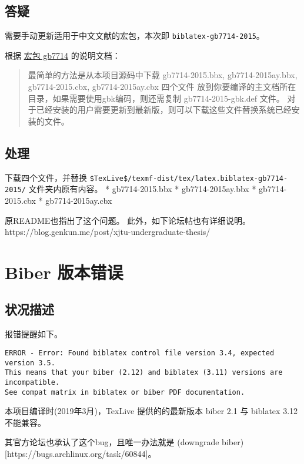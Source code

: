 \documentclass[../Main/thesis.tex]{subfiles}
\begin{document}
\subsection{答疑}

需要手动更新适用于中文文献的宏包，本次即 \texttt{biblatex-gb7714-2015}。

根据 \href{https://github.com/hushidong/biblatex-gb7714-2015}{宏包
gb7714} 的说明文档：

\begin{quote}
最简单的方法是从本项目源码中下载 gb7714-2015.bbx, gb7714-2015ay.bbx,
gb7714-2015.cbx, gb7714-2015ay.cbx 四个文件
放到你要编译的主文档所在目录，如果需要使用gbk编码，则还需复制
gb7714-2015-gbk.def 文件。
对于已经安装的用户需要更新到最新版，则可以下载这些文件替换系统已经安装的文件。
\end{quote}

\subsection{处理}

下载四个文件，并替换
\texttt{\$TexLive\$/texmf-dist/tex/latex.biblatex-gb7714-2015/}
文件夹内原有内容。 * gb7714-2015.bbx * gb7714-2015ay.bbx *
gb7714-2015.cbx * gb7714-2015ay.cbx

原README也指出了这个问题。 此外，如下论坛帖也有详细说明。
https://blog.genkun.me/post/xjtu-undergraduate-thesis/

\section{Biber 版本错误}

\subsection{状况描述}

报错提醒如下。

\begin{verbatim}
ERROR - Error: Found biblatex control file version 3.4, expected version 3.5.
This means that your biber (2.12) and biblatex (3.11) versions are incompatible.
See compat matrix in biblatex or biber PDF documentation.
\end{verbatim}

本项目编译时(2019年3月)，TexLive 提供的的最新版本 biber 2.1 与 biblatex
3.12 不能兼容。

其官方论坛也承认了这个bug，且唯一办法就是 (downgrade
biber){[}https://bugs.archlinux.org/task/60844{]}。
\end{document}

